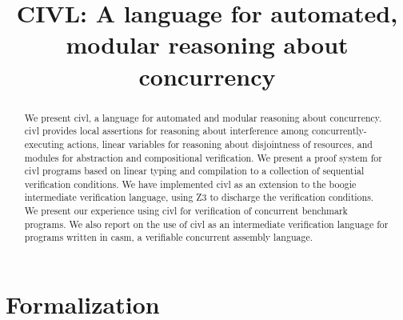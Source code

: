 \documentclass [preprint]{sigplanconf}
\theoremstyle{remark}
\theoremstyle{definition}
\newcommand{\civl}{{\sc civl}\xspace}
\newcommand{\boogie}{{\sc boogie}\xspace}
\newcommand{\zthree}{{\sc Z3}\xspace}
\newcommand{\casm}{{\sc casm}\xspace}
\begin{document}
\setlength{\pdfpageheight}{\paperheight}
\setlength{\pdfpagewidth}{\paperwidth}



\title{CIVL: A language for automated, modular reasoning about concurrency}
\authorinfo{}{}{}

\maketitle



\begin{abstract}
We present \civl, a language for automated and modular reasoning about concurrency.  
\civl provides 
local assertions for reasoning about interference among concurrently-executing actions,
linear variables for reasoning about disjointness of resources, 
and modules for abstraction and compositional verification.
We present a proof system for \civl programs based on linear typing and compilation to a 
collection of sequential verification conditions.
We have implemented \civl as an extension to the \boogie intermediate verification language,
using \zthree to discharge the verification conditions.
We present our experience using \civl for verification of concurrent benchmark programs.
We also report on the use of \civl as an intermediate verification language 
for programs written in \casm, a verifiable concurrent assembly language.
\end{abstract}

% 
% 
%
\section{Formalization}



% 
% 
% 


%
\end{document}
